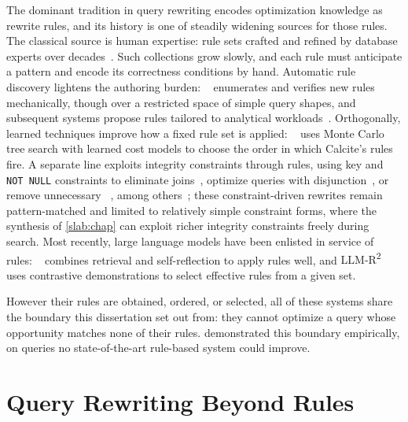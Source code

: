 The dominant tradition in query rewriting encodes optimization
knowledge as rewrite rules, and its history is one of steadily
widening sources for those rules. The classical source is human
expertise: rule sets crafted and refined by database experts over
decades~\cite{dintyala2020sqlcheck,lohman1988grammar,finance1991rule,pirahesh1992extensible,chen2016memsql,begoli2018apache,graefe1987rule,ahmed2006cost,levy1994query,muralikrishna1992improved,seshadri1996cost}.
Such collections grow slowly, and each rule must anticipate a pattern
and encode its correctness conditions by hand. Automatic rule
discovery lightens the authoring burden: \wetune~\cite{wetune}
enumerates and verifies new rules mechanically, though over a
restricted space of simple query shapes, and subsequent systems
propose rules tailored to analytical
workloads~\cite{sarthi2020generalized,blitz2,modi2021new,bruno2022computation}.
Orthogonally, learned techniques improve how a fixed rule set is
applied: \learnedrewrite~\cite{LR} uses Monte Carlo tree search with
learned cost models to choose the order in which Calcite's rules fire.
A separate line exploits integrity constraints through rules, using
key and \texttt{NOT NULL} constraints to eliminate
joins~\cite{join-elimination}, optimize queries with
disjunction~\cite{blog-disjunct}, or remove unnecessary
\sqldistinctcolor~\cite{habimana2015query}, among
others~\cite{presto-qo,db2-qo}; these constraint-driven rewrites
remain pattern-matched and limited to relatively simple constraint
forms, where the synthesis of \cref{slab:chap} can exploit richer
integrity constraints freely during search. Most recently, large
language models have been enlisted in service of rules:
\rbot~\cite{sun2024r} combines retrieval and self-reflection to apply
rules well, and \textsc{LLM-R\textsuperscript{2}}~\cite{li2024llm}
uses contrastive demonstrations to select effective rules from a given
set.

However their rules are obtained, ordered, or selected, all of these
systems share the boundary this dissertation set out from: they cannot
optimize a query whose opportunity matches none of their rules.
 demonstrated this boundary empirically, on queries no
state-of-the-art rule-based system could improve.

\section{Query Rewriting Beyond Rules}
\label{sec:related:beyondrules}
\label{gen:sec:related}

